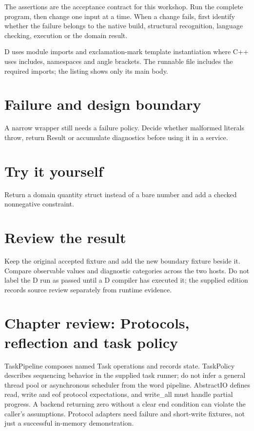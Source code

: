 The assertions are the acceptance contract for this workshop. Run the complete program, then change one input at a time. When a change fails, first identify whether the failure belongs to the native build, structural recognition, language checking, execution or the domain result.

\clearpage
{}
D uses module imports and exclamation-mark template instantiation where C++ uses includes, namespaces and angle brackets. The runnable file includes the required imports; the listing shows only its main body.


\section*{Failure and design boundary}
A narrow wrapper still needs a failure policy. Decide whether malformed literals throw, return Result or accumulate diagnostics before using it in a service.

\section*{Try it yourself}
Return a domain quantity struct instead of a bare number and add a checked nonnegative constraint.

\section*{Review the result}
Keep the original accepted fixture and add the new boundary fixture beside it. Compare observable values and diagnostic categories across the two hosts. Do not label the D run as passed until a D compiler has executed it; the supplied edition records source review separately from runtime evidence.

\clearpage
\section*{Chapter review: Protocols, reflection and task policy}
TaskPipeline composes named Task operations and records state. TaskPolicy describes sequencing behavior in the supplied task runner; do not infer a general thread pool or asynchronous scheduler from the word pipeline. AbstractIO defines read, write and eof protocol expectations, and write\_all must handle partial progress. A backend returning zero without a clear end condition can violate the caller's assumptions. Protocol adapters need failure and short-write fixtures, not just a successful in-memory demonstration.

